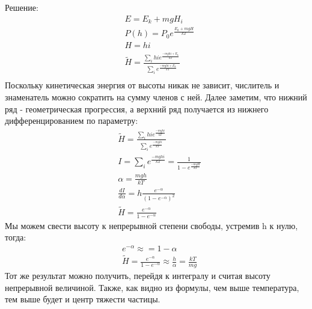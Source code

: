 \documentclass[a4paper, 12pt]{article}
\begin{document}
	Решение:
	\begin{equation*}
		\begin{aligned}
			& E=E_{k} + mgH_{i}                                                                               \\
			& P(h)=P_{0} e^{\frac{E_{k}+mgH}{kT}}                                                             \\
			& H= hi                                                                                           \\
			& \tilde{H} = \frac{\sum_{i} h i e^{\frac{-mghi+E_{k}}{kT}}}{\sum_{i} e^{\frac{-mghi+E_{k}}{kT}}} \\
		\end{aligned}
	\end{equation*}
	Поскольку кинетическая энергия от высоты никак не зависит, числитель и знаменатель можно сократить на сумму членов с ней. Далее заметим, что нижний ряд - геометрическая прогрессия, а верхний ряд получается из нижнего дифференцированием по параметру:
	\begin{equation*}
		\begin{aligned}
			& \tilde{H} = \frac{\sum_{i} hi e^{\frac{-mghi}{kT}}}{\sum_{i} e^{\frac{-mghi}{kT}}} \\
			& I = \sum_{i} e^{\frac{-mghi}{kT}} = \frac{1}{1-e^{\frac{-mgH}{kT}} }               \\
			& \alpha =\frac{mgh}{kT}                                                             \\
			& \frac{dI}{d \alpha} = h \frac{e^{- \alpha}}{(1-e^{- \alpha})^2}                    \\
			& \tilde{H} = \frac{e^{- \alpha}}{1-e^{- \alpha}}                                    
		\end{aligned}
	\end{equation*}
	Мы можем свести высоту к непрерывной степени свободы, устремив h к нулю, тогда:
	\begin{equation*}
		\begin{aligned}
			& e^{- \alpha} \approx = 1 - \alpha                                                        \\
			& \tilde{H} = \frac{e^{- \alpha}}{1-e^{- \alpha}} \approx \frac{h}{\alpha} = \frac{kT}{mg} 
		\end{aligned}
	\end{equation*}
	Тот же результат можно получить, перейдя к интегралу и считая высоту непрерывной величиной. Также, как видно из формулы, чем выше температура, тем выше будет и центр тяжести частицы.
	
\end{document}
